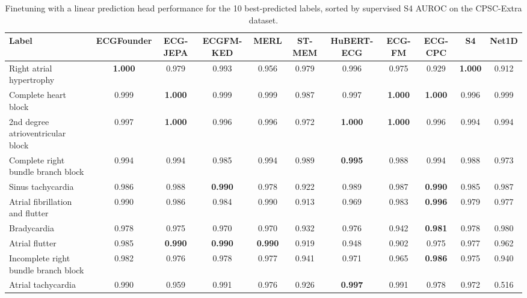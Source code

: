 \documentclass{article}
\begin{document}
                \begin{table}[htbp]
                    \centering
                    \tiny
                    \setlength{\tabcolsep}{2pt}
                    \caption{Finetuning with a linear prediction head performance for the 10 best-predicted labels, sorted by supervised S4 AUROC on the CPSC-Extra dataset.}
                    \begin{tabular}{lcccccccccc}
                        \toprule
                        \textbf{Label} & \textbf{ECGFounder} & \textbf{ECG-JEPA} & \textbf{ECGFM-KED} & \textbf{MERL} & \textbf{ST-MEM} & \textbf{HuBERT-ECG} & \textbf{ECG-FM} & \textbf{ECG-CPC} & \textbf{S4} & \textbf{Net1D} \\
                        \midrule
                        Right atrial hypertrophy & \textbf{1.000} & 0.979 & 0.993 & 0.956 & 0.979 & 0.996 & 0.975 & 0.929 & \textbf{1.000} & 0.912 \\
                        Complete heart block & 0.999 & \textbf{1.000} & 0.999 & 0.999 & 0.987 & 0.997 & \textbf{1.000} & \textbf{1.000} & 0.996 & 0.999 \\
                        2nd degree atrioventricular block & 0.997 & \textbf{1.000} & 0.996 & 0.996 & 0.972 & \textbf{1.000} & \textbf{1.000} & 0.996 & 0.994 & 0.994 \\
                        Complete right bundle branch block & 0.994 & 0.994 & 0.985 & 0.994 & 0.989 & \textbf{0.995} & 0.988 & 0.994 & 0.988 & 0.973 \\
                        Sinus tachycardia & 0.986 & 0.988 & \textbf{0.990} & 0.978 & 0.922 & 0.989 & 0.987 & \textbf{0.990} & 0.985 & 0.987 \\
                        Atrial fibrillation and flutter & 0.990 & 0.986 & 0.984 & 0.990 & 0.913 & 0.969 & 0.983 & \textbf{0.996} & 0.979 & 0.977 \\
                        Bradycardia & 0.978 & 0.975 & 0.970 & 0.970 & 0.932 & 0.976 & 0.942 & \textbf{0.981} & 0.978 & 0.980 \\
                        Atrial flutter & 0.985 & \textbf{0.990} & \textbf{0.990} & \textbf{0.990} & 0.919 & 0.948 & 0.902 & 0.975 & 0.977 & 0.962 \\
                        Incomplete right bundle branch block & 0.982 & 0.976 & 0.978 & 0.977 & 0.941 & 0.971 & 0.965 & \textbf{0.986} & 0.975 & 0.940 \\
                        Atrial tachycardia & 0.990 & 0.959 & 0.991 & 0.976 & 0.926 & \textbf{0.997} & 0.991 & 0.978 & 0.972 & 0.516 \\
                        \bottomrule
                    \end{tabular}
                    \label{tab:results_overview_cpsc_extra}
                \end{table}
                
\end{document}

